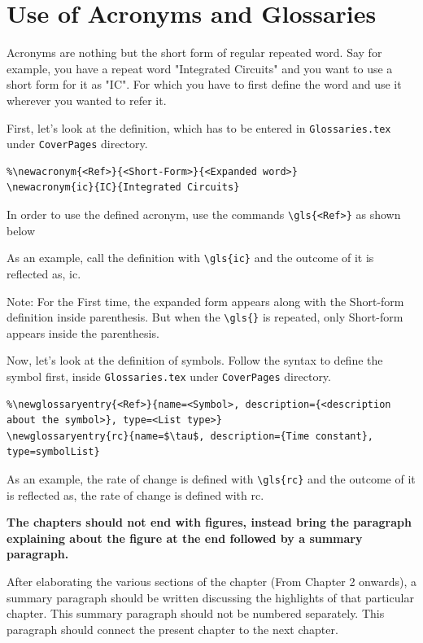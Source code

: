 \section{Use of Acronyms and Glossaries}
Acronyms are nothing but the short form of regular repeated word. Say for example, you have a repeat word "Integrated Circuits" and you want to use a short form for it as "IC". For which you have to first define the word and use it wherever you wanted to refer it.

First, let's look at the definition, which has to be entered in \texttt{Glossaries.tex} under \texttt{CoverPages} directory.
\begin{verbatim}
%\newacronym{<Ref>}{<Short-Form>}{<Expanded word>}
\newacronym{ic}{IC}{Integrated Circuits}
\end{verbatim}
In order to use the defined acronym, use the commands \verb|\gls{<Ref>}| as shown below

As an example, call the definition with \verb|\gls{ic}| and the outcome of it is reflected as, \gls{ic}.

Note: For the First time, the expanded form appears along with the Short-form definition inside parenthesis. But when the \verb|\gls{}| is repeated, only Short-form appears inside the parenthesis.

Now, let's look at the definition of symbols. Follow the syntax to define the symbol first, inside \texttt{Glossaries.tex} under \texttt{CoverPages} directory.
\begin{verbatim}
%\newglossaryentry{<Ref>}{name=<Symbol>, description={<description about the symbol>}, type=<List type>}
\newglossaryentry{rc}{name=$\tau$, description={Time constant}, type=symbolList}
\end{verbatim}

As an example, the rate of change is defined with \verb|\gls{rc}| and the outcome of it is reflected as, the rate of change is defined with \gls{rc}.

\vspace{0.75cm}

 \textbf{The chapters should not end with figures, instead bring the paragraph explaining about the figure at the end followed by a summary paragraph.}

After elaborating the various sections of the chapter (From Chapter 2 onwards), a summary paragraph should be written discussing the highlights of that particular chapter. This summary paragraph should not be numbered separately. This paragraph should connect the present chapter to the next chapter.